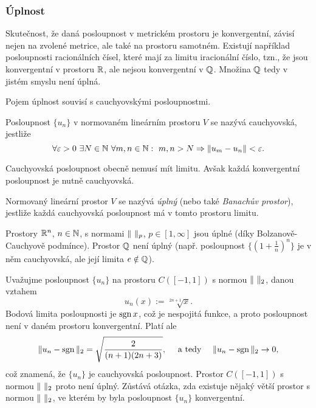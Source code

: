 \subsubsection{Úplnost}
% 
Skutečnost, že daná posloupnost v metrickém prostoru je konvergentní, závisí nejen na zvolené metrice, ale také na prostoru samotném.
Existují například posloupnosti racionálních čísel, které mají za limitu iracionální číslo, tzn., že jsou konvergentní v prostoru $\mathbb R$, ale nejsou konvergentní v $\mathbb Q$.
Množina $\mathbb Q$ tedy v jistém smyslu není úplná.

Pojem úplnost souvisí s cauchyovskými posloupnostmi.
% 
\begin{df}
Posloupnost $\{u_n\}$ v normovaném lineárním prostoru $V$ se nazývá \mbox{cauchyovská}, jestliže
\[ \forall\varepsilon>0~\exists N\in\mathbb N~\forall m,n\in\mathbb N:~m,n>N\Rightarrow \|u_m-u_n\|<\varepsilon. \]
\end{df}
% 
Cauchyovská posloupnost obecně nemusí mít limitu. Avšak každá konvergentní posloupnost je nutně cauchyovská.
% 
\begin{df}
Normovaný lineární prostor $V$ se nazývá \emph{úplný} (nebo také \emph{Banachův prostor}), jestliže každá cauchyovská posloupnost má v tomto prostoru limitu.
\end{df}
% 
\begin{ex}
Prostory $\mathbb R^n$, $n\in\mathbb N$, s normami $\|\ \|_p$, $p\in[1,\infty]$ jsou úplné (díky Bolzanově-Cauchyově podmínce).
Prostor $\mathbb Q$ není úplný (např. posloupnost $\{(1+\frac1n)^n\}$ je v něm cauchyovská, ale její limita $e\notin\mathbb Q$).
\end{ex}
% 
% 
\begin{ex}
Uvažujme posloupnost $\{u_n\}$ na prostoru $C([-1,1])$ s normou $\|\ \|_2$, danou vztahem
\[ u_n(x) := \sqrt[2n+1]{x}. \]
Bodová limita posloupnosti je $\operatorname{sgn} x$, což je nespojitá funkce, a proto posloupnost není v daném prostoru konvergentní.
Platí ale
\[ \|u_n-\operatorname{sgn}\|_2 = \sqrt{\frac2{(n+1)(2n+3)}}, \quad\mbox{ a tedy } \quad \|u_n-\operatorname{sgn}\|_2\rightarrow 0, \]
což znamená, že $\{u_n\}$ je cauchyovská posloupnost.
Prostor $C([-1,1])$ s normou $\|\ \|_2$ proto není úplný.
Zůstává otázka, zda existuje nějaký větší prostor s normou $\|\ \|_2$, ve kterém by byla posloupnost $\{u_n\}$ konvergentní.
\end{ex}

